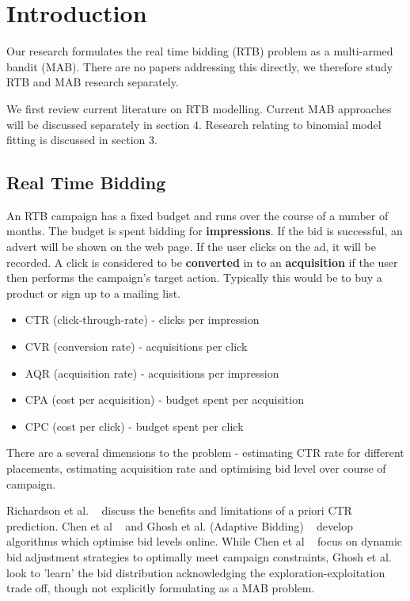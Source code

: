 \documentclass[11pt,a4,singlespacing,titlepagenumber=on]{scrreprt}
\numberwithin{equation}{chapter} %
\theoremstyle{remark}
\begin{document}
\chapter{Introduction}

Our research formulates the real time bidding (RTB) problem as a multi-armed bandit (MAB). There are no papers addressing this directly, we therefore study RTB and MAB research separately. 

We first review current literature on RTB modelling. Current MAB approaches will be discussed separately in section 4. Research relating to binomial model fitting is discussed in section 3.


\section{Real Time Bidding}

An RTB campaign has a fixed budget and runs over the course of a number of months. The budget is spent bidding for \textbf{impressions}. If the bid is successful, an advert will be shown on the web page. If the user clicks on the ad, it will be recorded. A click is considered to be \textbf{converted} in to an \textbf{acquisition} if the user then performs the campaign's target action. Typically this would be to buy a product or sign up to a mailing list.

\begin{itemize}
	\item CTR (click-through-rate) - clicks per impression
	\item CVR (conversion rate) - acquisitions per click 
	\item AQR (acquisition rate) - acquisitions per impression
	\item CPA (cost per acquisition) - budget spent per acquisition
	\item CPC (cost per click) - budget spent per click
\end{itemize}

There are a several dimensions to the problem - estimating CTR rate for different placements, estimating acquisition rate and optimising bid level over course of campaign.

Richardson et al. ~\cite{Richardson:2007:PCE:1242572.1242643} discuss the benefits and limitations of a priori CTR prediction. Chen et al ~\cite{Chen:2011:RBA:2020408.2020604} and Ghosh et al. (Adaptive Bidding) ~\cite{Ghosh:2009:ABD:1526709.1526744} develop algorithms which optimise bid levels online. While Chen et al ~\cite{Chen:2011:RBA:2020408.2020604} focus on dynamic bid adjustment strategies to optimally meet campaign constraints, Ghosh et al. ~\cite{raey} look to 'learn' the bid distribution acknowledging the exploration-exploitation trade off, though not explicitly formulating as a MAB problem.
\end{document}
